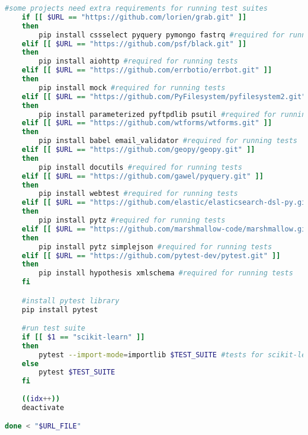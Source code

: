 \begin{lstlisting}[caption=Bash Script for Project Selection.,label=code:project_selection_automation.sh,language=Bash]
    #some projects need extra requirements for running test suites
    if [[ $URL == "https://github.com/lorien/grab.git" ]]
    then
        pip install cssselect pyquery pymongo fastrq #required for running tests
    elif [[ $URL == "https://github.com/psf/black.git" ]]
    then
        pip install aiohttp #required for running tests
    elif [[ $URL == "https://github.com/errbotio/errbot.git" ]]
    then
        pip install mock #required for running tests
    elif [[ $URL == "https://github.com/PyFilesystem/pyfilesystem2.git" ]]
    then
        pip install parameterized pyftpdlib psutil #required for running tests
    elif [[ $URL == "https://github.com/wtforms/wtforms.git" ]]
    then
        pip install babel email_validator #required for running tests
    elif [[ $URL == "https://github.com/geopy/geopy.git" ]]
    then
        pip install docutils #required for running tests
    elif [[ $URL == "https://github.com/gawel/pyquery.git" ]]
    then
        pip install webtest #required for running tests
    elif [[ $URL == "https://github.com/elastic/elasticsearch-dsl-py.git" ]]
    then
        pip install pytz #required for running tests
    elif [[ $URL == "https://github.com/marshmallow-code/marshmallow.git" ]]
    then
        pip install pytz simplejson #required for running tests
    elif [[ $URL == "https://github.com/pytest-dev/pytest.git" ]]
    then
        pip install hypothesis xmlschema #required for running tests
    fi

    #install pytest library
    pip install pytest

    #run test suite
    if [[ $1 == "scikit-learn" ]]
    then
        pytest --import-mode=importlib $TEST_SUITE #tests for scikit-learn need importlib to locate conftest
    else
        pytest $TEST_SUITE
    fi
    
    ((idx++))
    deactivate

done < "$URL_FILE"
\end{lstlisting}
